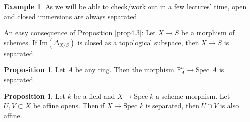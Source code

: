 \documentclass{article}
\theoremstyle{definition}
\newtheorem{prop}[theorem]{Proposition}
\newtheorem{example}{Example}[section]
\begin{document}
\begin{example}
    As we will be able to check/work out in a few lectures' time, open and closed immersions are always separated.
\end{example}
An easy consequence of Proposition \ref{prop4.3}: Let $X \to S$ be a morphism of schemes. If $\text{Im}(\Delta_{X/S})$ is closed as a topological subspace, then $X \to S$ is separated.
\begin{prop}
    Let $A$ be any ring. Then the morphism $\mathbb{P}_A^n \to \text{Spec }A$ is separated.
\end{prop}
\begin{prop}
    Let $k$ be a field and $X \to \text{Spec }k$ a scheme morphism. Let $U, V \subset X$ be affine opens. Then if $X \to \text{Spec }k$ is separated, then $U \cap V$ is also affine.
\end{prop}
\end{document}
